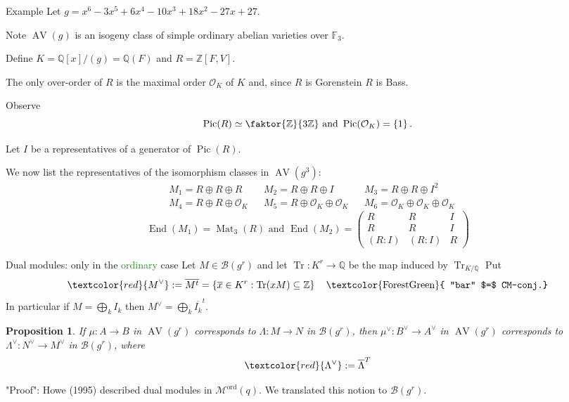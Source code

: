 \documentclass[usenames,dvipsnames]{beamer}
\def\Q{\mathbb{Q}}
\def\Z{\mathbb{Z}}
\def\F{\mathbb{F}}
\DeclareMathOperator{\AV}{AV}
\DeclareMathOperator{\Mat}{Mat}
\DeclareMathOperator{\Pic}{Pic}
\DeclareMathOperator{\End}{End}
\DeclareMathOperator{\Tr}{Tr}
\newcommand{\cB}{{\mathcal B}}
\newcommand{\cO}{{\mathcal O}}
\newcommand{\cM}{{\mathcal M}}
\newcommand{\set}[1]{\left\lbrace#1\right\rbrace }
\newcommand{\Modord}[1]{\cM^{\text{ord}}({#1})}
\newcommand{\red}[1]{\textcolor{red}{#1}}
\newcommand{\green}[1]{\textcolor{ForestGreen}{#1}}
\newtheorem{proposition}[df]{Proposition}
\begin{document}
\begin{frame}{ Example }
   Let $g=x^6 - 3x^5 + 6x^4 - 10x^3 + 18x^2 - 27x + 27$.
   
   \pause Note $\AV(g)$ is an isogeny class of simple ordinary abelian varieties over $\F_3$.
   
   \pause Define $K=\Q[x]/(g)=\Q(F)$ and $R=\Z[F,V]$.
   
   \pause The only over-order of $R$ is the maximal order $\cO_K$ of $K$ and, since $R$ is Gorenstein
   $R$ is Bass.
   
   \pause Observe
   \[ \Pic(R) \simeq \faktor{\Z}{3\Z} \text{ and } \Pic(\cO_K)=\set{1}. \]
   
   \pause Let $I$ be a representatives of a generator of $\Pic(R)$.
   
   \pause We now list the representatives of the isomorphism classes in $\AV(g^3)$:
   \begin{align*}
	& M_1=R \oplus R \oplus R &
	& M_2=R \oplus R \oplus I &
	& M_3=R \oplus R \oplus I^2 \\
	& M_4=R \oplus R \oplus \cO_K & 
	& M_5=R \oplus \cO_K \oplus \cO_K & 
	& M_6=\cO_K \oplus \cO_K \oplus \cO_K
   \end{align*}
   \pause 
   \[\End(M_1) = \Mat_3(R) \text{ and }
    \End(M_2)=
      \begin{pmatrix}
         R & R & I \\
         R & R & I \\
         (R:I) & (R:I) & R
      \end{pmatrix}\]
\end{frame}

\begin{frame}{ Dual modules: only in the \green{ordinary} case }
Let $M \in \cB(g^r)$ and let $\Tr:K^r \to \Q$ be the map induced by $\Tr_{K/\Q}$
\pause Put
\[ \red{M^\vee}:=\overline{M^t}=\set{ \overline{x} \in K^r : \Tr(xM)\subseteq \Z}\quad \text{\green{ "bar" $=$ CM-conj.}} \]
\pause In particular if $M=\bigoplus_k I_k$ then $M^\vee=\bigoplus_k \overline{I_k}^t$.

\pause
\begin{proposition}
 If $\mu:A\to B$ in $\AV(g^r)$ corresponds to $\Lambda:M\to N$ in $\cB(g^r)$,
 \pause then $\mu^\vee:B^\vee\to A^\vee$ in $\AV(g^r)$ corresponds to $\Lambda^\vee:N^\vee\to M^\vee$ in $\cB(g^r)$,
 where
 \[ \red{\Lambda^\vee} := \overline{\Lambda}^T \]
\end{proposition}
"Proof": Howe (1995) described dual modules in $\Modord{q}$.  We translated this notion to $\cB(g^r)$. 
\end{frame}
\end{document}
